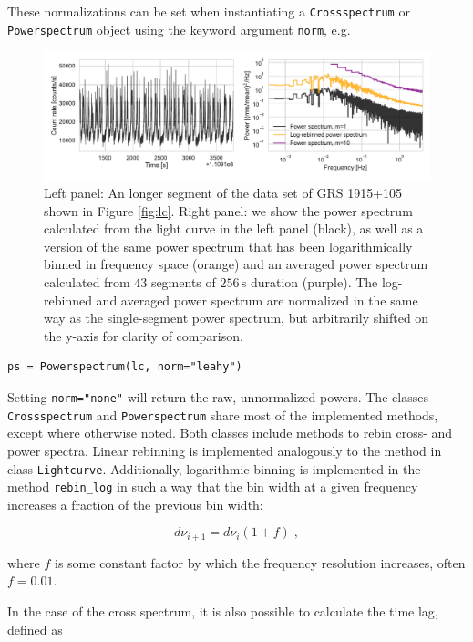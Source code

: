 \documentclass[12pt]{emulateapj}
\newcommand{\lightcurve}{\texttt{Lightcurve}\xspace}
\newcommand{\crossspectrum}{\texttt{Crossspectrum}\xspace}
\newcommand{\powerspectrum}{\texttt{Powerspectrum}\xspace}
\begin{document}
These normalizations can be set when instantiating a \crossspectrum or \powerspectrum object using the keyword argument \texttt{norm}, e.g.
\begin{figure}[htbp]
\begin{center}
\includegraphics[width=\textwidth]{example_lc_ps.pdf}
\caption{Left panel: An longer segment of the data set of GRS 1915+105 shown in Figure \ref{fig:lc}. Right panel: we show the power spectrum calculated from the light curve in the left panel (black), as well as a version of the same power spectrum that has been logarithmically binned in frequency space (orange) and an averaged power spectrum calculated from $43$ segments of $256\,\mathrm{s}$ duration (purple). The log-rebinned and averaged power spectrum are normalized in the same way as the single-segment power spectrum, but arbitrarily shifted on the y-axis for clarity of comparison.}
\label{fig:psd}
\end{center}
\end{figure}

\begin{verbatim}
ps = Powerspectrum(lc, norm="leahy")
\end{verbatim}

\noindent Setting \texttt{norm="none"} will return the raw, unnormalized powers. The classes \crossspectrum and \powerspectrum share most of the implemented methods, except where otherwise noted. Both classes include methods to rebin cross- and power spectra. Linear rebinning is implemented analogously to the method in class \lightcurve. Additionally, logarithmic binning is implemented in the method \texttt{rebin_log} in such a way that the bin width at a given frequency increases a fraction of the previous bin width:

\[
d\nu_{i+1} = d\nu_{i} (1 + f) \; ,
\]

\noindent where $f$ is some constant factor by which the frequency resolution increases, often $f = 0.01$. 

In the case of the cross spectrum, it is also possible to calculate the time lag, defined as
\end{document}
